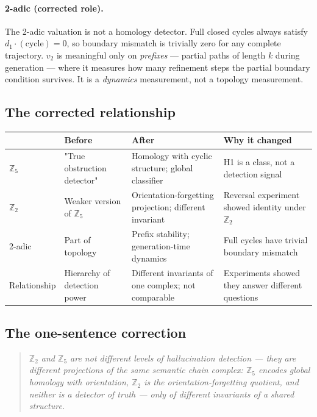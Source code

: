 \documentclass[11pt,a4paper]{article}
\begin{document}
\paragraph{2-adic (corrected role).}
The 2-adic valuation is not a homology detector.
Full closed cycles always satisfy $d_1 \cdot (\text{cycle}) = 0$,
so boundary mismatch is trivially zero for any complete trajectory.
$v_2$ is meaningful only on \emph{prefixes} --- partial paths
of length $k$ during generation --- where it measures how many
refinement steps the partial boundary condition survives.
It is a \emph{dynamics} measurement, not a topology measurement.

\subsection*{The corrected relationship}

\begin{center}
\renewcommand{\arraystretch}{1.3}\small
\begin{tabular}{p{2.5cm}p{3.2cm}p{3.2cm}p{3.2cm}}
\toprule
 & \textbf{Before} & \textbf{After} & \textbf{Why it changed} \\
\midrule
$\mathbb{Z}_5$ &
  "True obstruction detector" &
  Homology with cyclic structure; global classifier &
  H1 is a class, not a detection signal \\
$\mathbb{Z}_2$ &
  Weaker version of $\mathbb{Z}_5$ &
  Orientation-forgetting projection; different invariant &
  Reversal experiment showed identity under $\mathbb{Z}_2$ \\
2-adic &
  Part of topology &
  Prefix stability; generation-time dynamics &
  Full cycles have trivial boundary mismatch \\
Relationship &
  Hierarchy of detection power &
  Different invariants of one complex; not comparable &
  Experiments showed they answer different questions \\
\bottomrule
\end{tabular}
\end{center}

\subsection*{The one-sentence correction}

\begin{quote}
\emph{$\mathbb{Z}_2$ and $\mathbb{Z}_5$ are not different levels of
hallucination detection --- they are different projections of the same
semantic chain complex: $\mathbb{Z}_5$ encodes global homology with
orientation, $\mathbb{Z}_2$ is the orientation-forgetting quotient, and
neither is a detector of truth --- only of different invariants of a
shared structure.}
\end{quote}
\end{document}
